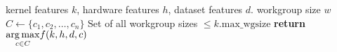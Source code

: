 \begin{algorithmic}[1]
\Require kernel features $k$, hardware features $h$, dataset features
$d$.
\Ensure workgroup size $w$
\State $C \leftarrow \{c_1, c_2, \ldots, c_n \}$
\Comment Set of all workgroup sizes $\le k.\text{max\_wgsize}$
\State \textbf{return} $\underset{c \in C}{\operatorname*{arg\,max}} f(k,h,d,c)$
\end{algorithmic}

